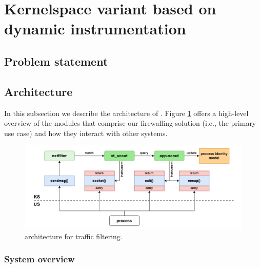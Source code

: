 \section{Kernelspace variant based on dynamic instrumentation}
\label{appfw:appscout}

\subsection{Problem statement}
\label{appfw:appscout:intro}


\subsection{Architecture}
\label{apffw:appscout:architecture}

In this subsection we describe the architecture of \scout{}. Figure
\ref{appfw:appscout:fig:sys-architecture} offers a high-level overview of the
modules that comprise our firewalling solution (i.e., the primary use case) and
how they interact with other systems.

\begin{figure}
    \centering
    \includegraphics[width=\textwidth,keepaspectratio]{figures/appscout-architecture.pdf}
    \caption{\scout{} architecture for traffic filtering.}
    \label{appfw:appscout:fig:sys-architecture}
\end{figure}


\subsubsection{System overview}

